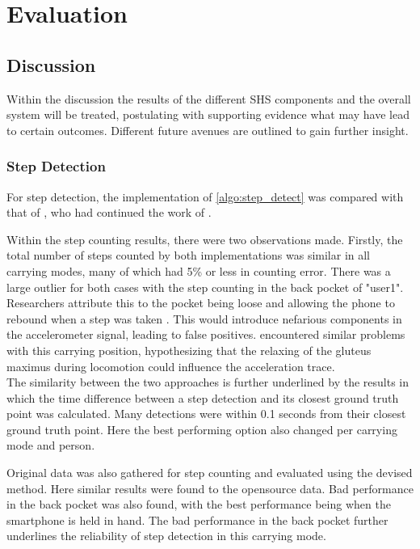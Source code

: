\chapter{Evaluation}

\section{Discussion}
Within the discussion the results of the different \ac{SHS} components and the overall system will be treated, postulating with supporting evidence what may have lead to certain outcomes. Different future avenues are outlined to gain further insight.

\subsection*{Step Detection}
For step detection, the implementation of \cref{algo:step_detect} was compared with that of \citet{Salvi2018}, who had continued the work of \cite{Harle2013}.  \par 
Within the step counting results, there were two observations made. Firstly, the total number of steps counted by both implementations was similar in all carrying modes, many of which had 5\% or less in counting error. There was a large outlier for both cases with the step counting in the back pocket of "user1". Researchers attribute this to the pocket being loose and allowing the phone to rebound when a step was taken \cite{Salvi2018}. This would introduce nefarious components in the accelerometer signal, leading to false positives. \citet{Brajdic2013} encountered similar problems with this carrying position, hypothesizing that the relaxing of the gluteus maximus during locomotion could influence the acceleration trace.\\
The similarity between the two approaches is further underlined by the results in which the time difference between a step detection and its closest ground truth point was calculated. Many detections were within 0.1 seconds from their closest ground truth point. Here the best performing option also changed per carrying mode and person.\par 
Original data was also gathered for step counting and evaluated using the devised method. Here similar results were found to the opensource data. Bad performance in the back pocket was also found, with the best performance being when the smartphone is held in hand. The bad performance in the back pocket further underlines the reliability of step detection in this carrying mode. \par  
